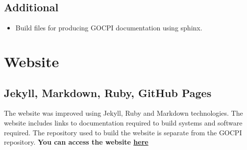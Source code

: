 \documentclass[12pt]{article}
\begin{document}
\subsection{Additional}
\begin{itemize}
	\item Build files for producing GOCPI documentation using sphinx.
\end{itemize}
\newpage

\section{Website}
\subsection{Jekyll, Markdown, Ruby, GitHub Pages}
The website was improved using Jekyll, Ruby and Markdown technologies.
The website includes links to documentation required to build systems and software required.
The repository used to build the website is separate from the GOCPI repository.
\textbf{You can access the website \href{https://connormcdowall.com/gocpi.html}{here}}
\end{document}
